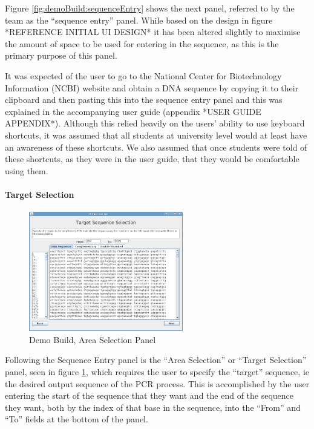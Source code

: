 Figure \ref{fig:demoBuild:sequenceEntry} shows the next panel,
referred to by the team as the ``sequence entry'' panel.
While based on the design in figure *REFERENCE INITIAL UI DESIGN* it
has been altered slightly to maximise the amount of space to be used
for entering in the sequence, as this is the primary purpose of this
panel.

It was expected of the user to go to the National Center for
Biotechnology Information (NCBI) website and obtain a DNA sequence by
copying it to their clipboard and then pasting this into the sequence
entry panel and this was explained in the accompanying user guide
(appendix *USER GUIDE APPENDIX*).
Although this relied heavily on the users' ability to use keyboard
shortcuts, it was assumed that all students at university level would
at least have an awareness of these shortcuts.
We also assumed that once students were told of these shortcuts, as
they were in the user guide, that they would be comfortable using
them.


\paragraph{Target Selection}

\begin{figure}[h]
  \begin{center}
    \includegraphics[width=0.6\textwidth]{./images/demoBuild/areaSelection.png}
    \caption{
      \label{fig:demoBuild:areaSelection}
      Demo Build, Area Selection Panel
    }
  \end{center}
\end{figure}

Following the Sequence Entry panel is the ``Area Selection'' or
``Target Selection'' panel, seen in figure
\ref{fig:demoBuild:areaSelection}, which requires the user to specify
the ``target'' sequence, ie the desired output sequence of the PCR
process.
This is accomplished by the user entering the start of the sequence
that they want and the end of the sequence they want, both by the
index of that base in the sequence, into the ``From'' and ``To''
fields at the bottom of the panel.

